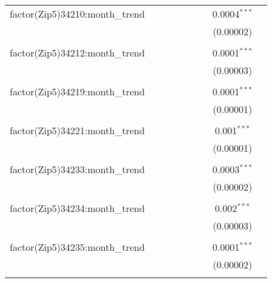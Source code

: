 \begin{table}[H]
{\begin{tabular}{@{\extracolsep{5pt}}lcccccccc}
  factor(Zip5)34210:month\_trend &  &  &  &  &  &  & 0.0004$^{***}$ &  \\  

   &  &  &  &  &  &  & (0.00002) &  \\  

   & & & & & & & & \\  

  factor(Zip5)34212:month\_trend &  &  &  &  &  &  & 0.0001$^{***}$ &  \\  

   &  &  &  &  &  &  & (0.00003) &  \\  

   & & & & & & & & \\  

  factor(Zip5)34219:month\_trend &  &  &  &  &  &  & 0.0001$^{***}$ &  \\  

   &  &  &  &  &  &  & (0.00001) &  \\  

   & & & & & & & & \\  

  factor(Zip5)34221:month\_trend &  &  &  &  &  &  & 0.001$^{***}$ &  \\  

   &  &  &  &  &  &  & (0.00001) &  \\  

   & & & & & & & & \\  

  factor(Zip5)34233:month\_trend &  &  &  &  &  &  & 0.0003$^{***}$ &  \\  

   &  &  &  &  &  &  & (0.00002) &  \\  

   & & & & & & & & \\  

  factor(Zip5)34234:month\_trend &  &  &  &  &  &  & 0.002$^{***}$ &  \\  

   &  &  &  &  &  &  & (0.00003) &  \\  

   & & & & & & & & \\  

  factor(Zip5)34235:month\_trend &  &  &  &  &  &  & 0.0001$^{***}$ &  \\  

   &  &  &  &  &  &  & (0.00002) &  \\  

   & & & & & & & & \\  


\end{tabular}}
\end{table}
